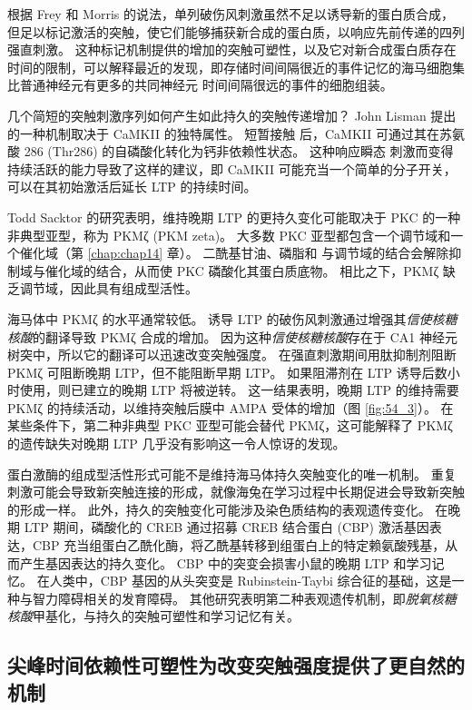 根据 Frey 和 Morris 的说法，单列破伤风刺激虽然不足以诱导新的蛋白质合成，但足以标记激活的突触，使它们能够捕获新合成的蛋白质，以响应先前传递的四列 强直刺激。
这种标记机制提供的增加的突触可塑性，以及它对新合成蛋白质存在时间的限制，可以解释最近的发现，即存储时间间隔很近的事件记忆的海马细胞集比普通神经元有更多的共同神经元 时间间隔很远的事件的细胞组装。


几个简短的突触刺激序列如何产生如此持久的突触传递增加？
John Lisman 提出的一种机制取决于 CaMKII 的独特属性。
短暂接触  后，CaMKII 可通过其在苏氨酸 286 (Thr286) 的自磷酸化转化为钙非依赖性状态。
这种响应瞬态  刺激而变得持续活跃的能力导致了这样的建议，即 CaMKII 可能充当一个简单的分子开关，可以在其初始激活后延长 LTP 的持续时间。


Todd Sacktor 的研究表明，维持晚期 LTP 的更持久变化可能取决于 PKC 的一种非典型亚型，称为 PKMζ (PKM zeta)。
大多数 PKC 亚型都包含一个调节域和一个催化域（第 \ref{chap:chap14} 章）。
二酰基甘油、磷脂和  与调节域的结合会解除抑制域与催化域的结合，从而使 PKC 磷酸化其蛋白质底物。
相比之下，PKMζ 缺乏调节域，因此具有组成型活性。


海马体中 PKMζ 的水平通常较低。
诱导 LTP 的破伤风刺激通过增强其\textit{信使核糖核酸}的翻译导致 PKMζ 合成的增加。
因为这种\textit{信使核糖核酸}存在于 CA1 神经元树突中，所以它的翻译可以迅速改变突触强度。
在强直刺激期间用肽抑制剂阻断 PKMζ 可阻断晚期 LTP，但不能阻断早期 LTP。
如果阻滞剂在 LTP 诱导后数小时使用，则已建立的晚期 LTP 将被逆转。
这一结果表明，晚期 LTP 的维持需要 PKMζ 的持续活动，以维持突触后膜中 AMPA 受体的增加（图 \ref{fig:54_3}）。
在某些条件下，第二种非典型 PKC 亚型可能会替代 PKMζ，这可能解释了 PKMζ 的遗传缺失对晚期 LTP 几乎没有影响这一令人惊讶的发现。


蛋白激酶的组成型活性形式可能不是维持海马体持久突触变化的唯一机制。
重复刺激可能会导致新突触连接的形成，就像海兔在学习过程中长期促进会导致新突触的形成一样。
此外，持久的突触变化可能涉及染色质结构的表观遗传变化。
在晚期 LTP 期间，磷酸化的 CREB 通过招募 CREB 结合蛋白 (CBP) 激活基因表达，CBP 充当组蛋白乙酰化酶，将乙酰基转移到组蛋白上的特定赖氨酸残基，从而产生基因表达的持久变化。
CBP 中的突变会损害小鼠的晚期 LTP 和学习记忆。
在人类中，CBP 基因的从头突变是 Rubinstein-Taybi 综合征的基础，这是一种与智力障碍相关的发育障碍。
其他研究表明第二种表观遗传机制，即\textit{脱氧核糖核酸}甲基化，与持久的突触可塑性和学习记忆有关。



\subsection{尖峰时间依赖性可塑性为改变突触强度提供了更自然的机制}

